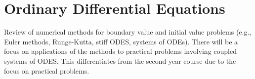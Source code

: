 \chapter{Ordinary Differential Equations}
Review of numerical methods for boundary value and initial value problems (e.g., Euler methods, Runge-Kutta, stiff ODES, systems of ODEs). There will be a focus on applications of the methods to practical problems involving coupled systems of ODES. This differentiates from the second-year course due to the focus on practical problems. 
